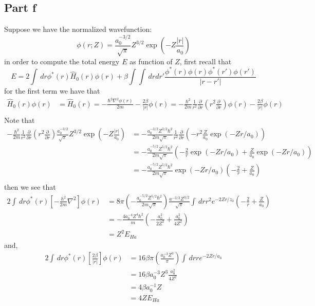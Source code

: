 \documentclass[12pt]{report}
\theoremstyle{custom}
\begin{document}
\subsection*{Part f}
Suppose we have the normalized wavefunction:
\begin{equation*}
\phi(r;Z) = \frac{a_0^{-3/2}}{\sqrt{\pi}} Z^{3/2} \exp\left(-Z \frac{|r|}{a_0}\right)
\end{equation*}
in order to compute the total energy $E$ as function of $Z$, first recall that
\begin{equation*}
     E =  2\int \, dr \phi^*(r) \hat{H}_0(r) \phi(r) + \beta \int\int \, dr dr' \frac{\phi^*(r)\phi(r)\phi^*(r')\phi(r')}{|r - r'|}
\end{equation*}
for the first term we have that
\begin{align*}
    \hat{H}_0(r)\phi(r) &= \hat{H}_0(r) = -\frac{\hbar^2 \nabla^2\phi(r)}{2m} - \frac{2\beta}{|r|}\phi(r) = -\frac{\hbar^2}{2m} \frac{1}{r^2} \frac{\partial}{\partial r}\left(r^2 \frac{\partial}{\partial r}\right)\phi(r) - \frac{2\beta}{|r|}\phi(r) \\
\end{align*}
Note that
\begin{align*}
     -\frac{\hbar^2}{2m} \frac{1}{r^2} \frac{\partial}{\partial r}\left(r^2 \frac{\partial}{\partial r}\right)\frac{a_0^{-3/2}}{\sqrt{\pi}} Z^{3/2} \exp\left(-Z \frac{|r|}{a_0}\right) &= -\frac{a_0^{-3/2}Z^{3/2}\hbar^2}{2m\sqrt{\pi}}\frac{1}{r^2}\frac{\partial}{\partial r} \left(-r^2\frac{Z}{a_0} \exp(-Zr/a_0)\right) \\
     &= -\frac{a_0^{-5/2}Z^{5/2}\hbar^2}{2m\sqrt{\pi}} \left(-\frac{2}{r} \exp(-Zr/a_0) + \frac{Z}{a_0} \exp(-Zr/a_0)\right) \\
     &= -\frac{a_0^{-5/2}Z^{5/2}\hbar^2}{2m\sqrt{\pi}}\exp(-Zr/a_0) \left(-\frac{2}{r}  + \frac{Z}{a_0}\right) \\
\end{align*}
then we see that
\begin{align*}
    2\int \, dr \phi^*(r) \left[-\frac{h^2}{2m}\nabla^2\right] \phi(r) &= 8\pi \left(-\frac{a_0^{-5/2}Z^{5/2}\hbar^2}{2m\sqrt{\pi}}\right)\frac{a^{-3/2}Z^{3/2}}{\sqrt{\pi}} \int \, dr r^2 e^{-2Zr/z_0} \left(-\frac{2}{r}  + \frac{Z}{a_0}\right) \\
    &= -\frac{4a_0^{-4}Z^{4}\hbar^2}{m} \left(-\frac{a_0^2}{2Z^2} + \frac{a_0^2}{4Z^2}\right) \\
    &= Z^2 E_{Ha}
\end{align*}
and,
\begin{align*}
    2\int \, dr\phi^*(r) \left[\frac{2\beta}{|r|}\right] \phi(r) &=16 \beta \pi \left(\frac{a_0^{-3}Z^{3}}{\pi}\right)\int \, dr r e^{-2Zr/a_0} \\
    &= 16 \beta a_0^{-3}Z^3 \frac{a_0^2}{4Z^2} \\
    &= 4 \beta a_0^{-1} Z  \\
    &= 4Z E_{Ha}
\end{align*}
\end{document}

